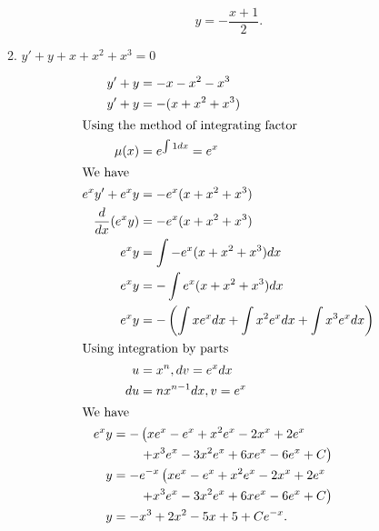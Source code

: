 \documentclass{zc-ust-hw}
\begin{document}
\begin{enumerate}
\begin{enumerate}
\begin{sol}
          \[
            y = -\frac{x+1}{2}
          .\] 
        \end{sol}
      \item $y'+y+x+x^2+x^3=0$
        \begin{sol}
          \begin{align}
            y'+y&=-x-x^2-x^3\\
            y'+y&=-(x+x^2+x^3)\\
            \intertext{Using the method of integrating factor}
            \mu(x)&=e^{\int 1 dx}=e^x\\
            \intertext{We have}
            e^x y'+e^x y&=-e^x(x+x^2+x^3)\\
            \frac{d}{dx}(e^x y)&=-e^x(x+x^2+x^3)\\
            e^x y&=\int -e^x(x+x^2+x^3) dx\\
            e^x y&=-\int e^x(x+x^2+x^3) dx\\
            e^x y&=-\left(\int x e^x dx+\int x^2 e^x dx+\int x^3 e^x dx\right)\\
            \intertext{Using integration by parts}
            u&=x^n, dv=e^x dx\\
            du&=nx^{n-1} dx, v=e^x\\
            \intertext{We have}
            \nonumber
            e^x y=-&\left(xe^{x}-e^{x}+x^2e^{x}-2x^{x}+2e^{x} \right. \\
                 &\left. +x^3e^{x}-3x^2e^{x}+6xe^{x}-6e^{x}+C \right) \\
            \nonumber
            y=-&e^{-x}\left(  xe^{x}-e^{x}+x^2e^{x}-2x^{x}+2e^{x} \right. \\
                 &\left. +x^3e^{x}-3x^2e^{x}+6xe^{x}-6e^{x}+C \right) \\
            y=-&x^3 +2x^2-5x+5+Ce^{-x}
          .\end{align}
        \end{sol}
    \end{enumerate}


\end{enumerate}
\end{document}
